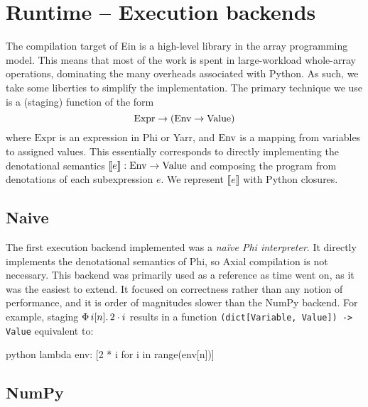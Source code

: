 
\needspace{10em}
\section{Runtime -- Execution backends}
\label{execution-backend}

The compilation target of Ein is a high-level library in the array programming model. This means that most of the work is spent in large-workload whole-array operations, dominating the many overheads associated with Python. As such, we take some liberties to simplify the implementation. The primary technique we use is a (staging) function of the form
$$ \mathrm{Expr} \to \left( \denotenv \to \denotvalue \right) $$
where $\mathrm{Expr}$ is an expression in Phi or Yarr, and $\mathrm{Env}$ is a mapping from variables to assigned values. This essentially corresponds to directly implementing the denotational semantics $\llbracket e \rrbracket : \mathrm{Env} \to \mathrm{Value}$ and composing the program from denotations of each subexpression $e$. We represent $\llbracket e \rrbracket$ with Python closures.

\subsection{Naive}

The first execution backend implemented was a \textit{na\"ive Phi interpreter}. It directly implements the denotational semantics of Phi, so Axial compilation is not necessary. 
This backend was primarily used as a reference as time went on, as it was the easiest to extend. It focused on correctness rather than any notion of performance, and it is order of magnitudes slower than the NumPy backend. For example, staging $\Phi\, {i}[{n}] \ldotp {2 \cdot i}$ results in a function \texttt{(dict[Variable, Value]) -> Value} equivalent to:
\begin{center}
\begin{cminted}{python}
lambda env: [2 * i for i in range(env[n])]
\end{cminted}
\end{center}

\subsection{NumPy}

